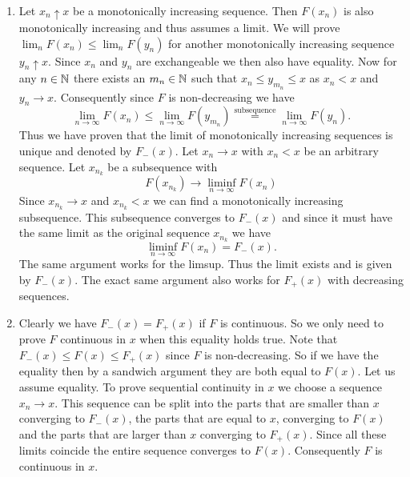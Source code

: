 \begin{solution}
\begin{enumerate}[wide=0pt]
    \item[\ref{it: (monotone functions) left and right limits}]
    Let \(x_n\uparrow x\) be a monotonically increasing sequence. Then
    \(F(x_n)\) is also monotonically increasing and thus assumes a limit.
    We will prove \(\lim_n F(x_n) \le \lim_n F(y_n)\)
    for another monotonically increasing sequence \(y_n\uparrow x\).
    Since \(x_n\) and \(y_n\) are exchangeable we then also have equality.
    Now for any \(n\in \mathbb{N}\) there exists an \(m_n\in \mathbb{N}\) such that
    \(x_n \le y_{m_n} \le x\) as \(x_n < x\) and \(y_n\to x\). Consequently
    since \(F\) is non-decreasing we have
    \[
        \lim_{n\to\infty} F(x_n) \le \lim_{n\to\infty}F(y_{m_n}) \overset{\text{subsequence}}= \lim_{n\to\infty}F(y_n).
    \]
    Thus we have proven that the limit of monotonically increasing
    sequences is unique and denoted by \(F_-(x)\). Let \(x_n \to x\) with \(x_n < x\) be an
    arbitrary sequence. Let \(x_{n_k}\) be a subsequence with
    \[
        F(x_{n_k}) \to \liminf_{n\to\infty} F(x_n)
    \]
    Since \(x_{n_k} \to x\) and \(x_{n_k} < x\) we can find a monotonically increasing subsequence.
    This subsequence converges to \(F_-(x)\) and since it must have the
    same limit as the original sequence \(x_{n_k}\) we have
    \[
        \liminf_{n\to\infty} F(x_n) = F_-(x).       
    \]
    The same argument works for the limsup. Thus the limit exists and is
    given by \(F_-(x)\). The exact same argument also works for
    \(F_+(x)\) with decreasing sequences.

    \item[\ref{it: F continuous if and only if all coincide}]
    Clearly we have \(F_-(x) = F_+(x)\) if \(F\) is continuous.  So we
    only need to prove \(F\) continuous in \(x\) when this equality
    holds true.  Note that
    \(F_-(x) \le F(x) \le F_+(x)\) since \(F\) is non-decreasing.
    So if we have the equality then by a sandwich argument they are
    both equal to \(F(x)\). Let us assume equality. To prove
    sequential continuity in \(x\) we choose a sequence \(x_n\to x\).
    This sequence can be split into the parts that are smaller than \(x\)
    converging to \(F_-(x)\), the parts that are equal to \(x\),
    converging to \(F(x)\) and the parts that are larger than \(x\)
    converging to \(F_+(x)\). Since all these limits coincide the entire
    sequence converges to \(F(x)\). Consequently \(F\) is continuous in
    \(x\).


\end{enumerate}
\end{solution}
